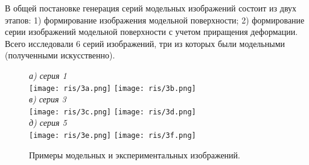 \documentclass[a4paper]{jctart10}
\begin{document}
В общей постановке генерация серий модельных изображений состоит из двух этапов: 1) формирование изображения модельной поверхности; 2) формирование серии изображений модельной поверхности с учетом приращения деформации. Всего исследовали 6 серий изображений, три из которых были модельными (полученными искусственно).

\begin{figure}[htbp]
    \centering
		\small{\it а) серия 1}\hspace*{75mm}{\it б) серия 2}\\[2mm]
    \texttt{[image: ris/3a.png]}\hspace*{15mm}
		\texttt{[image: ris/3b.png]}\\
		{\it в) серия 3}\hspace*{75mm}{\it г) серия 4}\\[2mm]
		\texttt{[image: ris/3c.png]}\hspace*{15mm}
		\texttt{[image: ris/3d.png]}\\
		{\it д) серия 5}\hspace*{75mm}{\it е) серия 6}\\[2mm]
		\texttt{[image: ris/3e.png]}\hspace*{15mm}
		\texttt{[image: ris/3f.png]}
    \caption{Примеры модельных и экспериментальных изображений.}
\end{figure}
\end{document}
